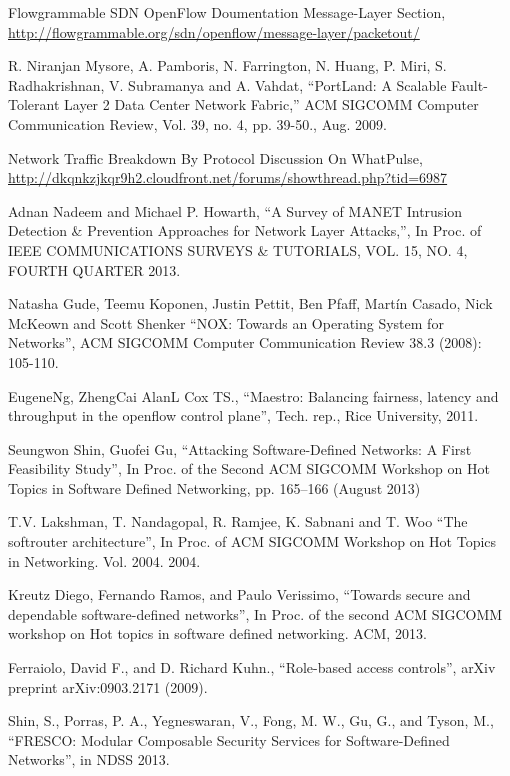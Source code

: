 \begin{thebibliography}{1}
Flowgrammable SDN OpenFlow Doumentation Message-Layer Section, \url{http://flowgrammable.org/sdn/openflow/message-layer/packetout/}

R. Niranjan Mysore, A. Pamboris, N. Farrington, N. Huang, P. Miri, S. Radhakrishnan, V. Subramanya and A. Vahdat,
``PortLand: A Scalable Fault-Tolerant Layer 2 Data Center Network Fabric,'' ACM SIGCOMM Computer Communication Review, Vol. 39, no. 4, pp. 39-50., Aug. 2009.

Network Traffic Breakdown By Protocol Discussion On WhatPulse, \url{http://dkqnkzjkqr9h2.cloudfront.net/forums/showthread.php?tid=6987}







Adnan Nadeem and Michael P. Howarth,
``A Survey of MANET Intrusion Detection \& Prevention Approaches for Network Layer Attacks,'', In Proc. of IEEE COMMUNICATIONS SURVEYS \& TUTORIALS, VOL. 15, NO. 4, FOURTH QUARTER 2013.

Natasha Gude, Teemu Koponen, Justin Pettit, Ben Pfaff, Martín Casado, Nick McKeown and Scott Shenker
``NOX: Towards an Operating System for Networks'', ACM SIGCOMM Computer Communication Review 38.3 (2008): 105-110.

EugeneNg, ZhengCai AlanL Cox TS.,
``Maestro: Balancing fairness, latency and throughput in the openflow control plane'', Tech. rep., Rice University, 2011.

Seungwon Shin, Guofei Gu, 
``Attacking Software-Defined Networks: A First Feasibility Study'', In Proc. of the Second ACM SIGCOMM Workshop on Hot Topics in Software Defined Networking, pp. 165–166 (August 2013)

T.V. Lakshman, T. Nandagopal, R. Ramjee, K. Sabnani and T. Woo
``The softrouter architecture'', In Proc. of ACM SIGCOMM Workshop on Hot Topics in Networking. Vol. 2004. 2004.

Kreutz Diego, Fernando Ramos, and Paulo Verissimo, 
``Towards secure and dependable software-defined networks'', In Proc. of the second ACM SIGCOMM workshop on Hot topics in software defined networking. ACM, 2013.


Ferraiolo, David F., and D. Richard Kuhn., 
``Role-based access controls'', arXiv preprint arXiv:0903.2171 (2009).

Shin, S., Porras, P. A., Yegneswaran, V., Fong, M. W., Gu, G., and Tyson, M.,
``FRESCO: Modular Composable Security Services for Software-Defined Networks'', in NDSS 2013.


\end{thebibliography}
